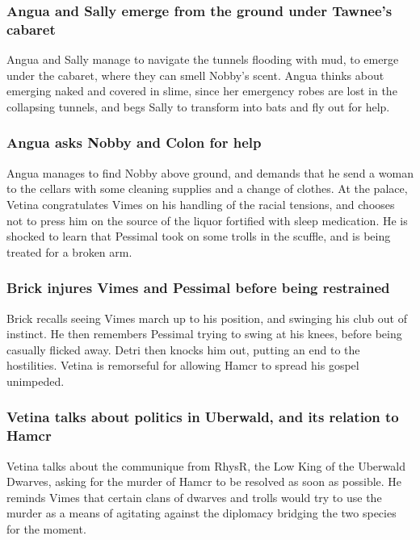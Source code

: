 \subsubsection{\Gls{Angua} and \Gls{Sally} emerge from the ground under \Gls{Tawnee}'s cabaret}
\Gls{Angua} and \Gls{Sally} manage to navigate the tunnels flooding with mud, to emerge under the
cabaret, where they can smell \Gls{Nobby}'s scent. \Gls{Angua} thinks about emerging naked and
covered in slime, since her emergency robes are lost in the collapsing tunnels, and begs \Gls{Sally}
to transform into bats and fly out for help.

\subsubsection{\Gls{Angua} asks \Gls{Nobby} and \Gls{Colon} for help}
\Gls{Angua} manages to find \Gls{Nobby} above ground, and demands that he send a woman to the
cellars with some cleaning supplies and a change of clothes. At the palace, \Gls{Vetina}
congratulates \Gls{Vimes} on his handling of the racial tensions, and chooses not to press him on
the source of the liquor fortified with sleep medication. He is shocked to learn that \Gls{Pessimal}
took on some trolls in the scuffle, and is being treated for a broken arm.

\subsubsection{\Gls{Brick} injures \Gls{Vimes} and \Gls{Pessimal} before being restrained}
\Gls{Brick} recalls seeing \Gls{Vimes} march up to his position, and swinging his club out of
instinct. He then remembers \Gls{Pessimal} trying to swing at his knees, before being casually
flicked away. \Gls{Detri} then knocks him out, putting an end to the hostilities. \Gls{Vetina}
is remorseful for allowing \Gls{Hamcr} to spread his gospel unimpeded.

\subsubsection{\Gls{Vetina} talks about politics in Uberwald, and its relation to \Gls{Hamcr}}
\Gls{Vetina} talks about the communique from \Gls{RhysR}, the Low King of the Uberwald Dwarves,
asking for the murder of \Gls{Hamcr} to be resolved as soon as possible. He reminds \Gls{Vimes}
that certain clans of dwarves and trolls would try to use the murder as a means of agitating against
the diplomacy bridging the two species for the moment.

